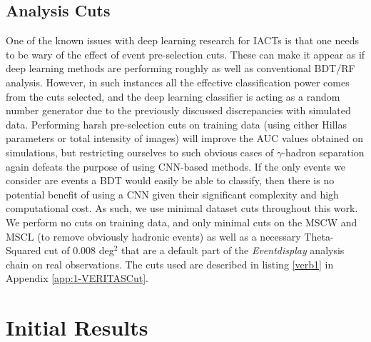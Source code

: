 \subsection{Analysis Cuts}
One of the known issues with deep learning research for IACTs is that one needs to be wary of the effect of event pre-selection cuts. These can make it appear as if deep learning methods are performing roughly as well as conventional BDT/RF analysis. However, in such instances all the effective classification power comes from the cuts selected, and the deep learning classifier is acting as a random number generator due to the previously discussed discrepancies with simulated data. Performing harsh pre-selection cuts on training data (using either Hillas parameters or total intensity of images) will improve the AUC values obtained on simulations, but restricting ourselves to such obvious cases of $\gamma$-hadron separation again defeats the purpose of using CNN-based methods. If the only events we consider are events a BDT would easily be able to classify, then there is no potential benefit of using a CNN given their significant complexity and high computational cost. As such, we use minimal dataset cuts throughout this work. We perform no cuts on training data, and only minimal cuts on the MSCW and MSCL (to remove obviously hadronic events) as well as a necessary Theta-Squared cut of 0.008 deg$^2$ that are a default part of the \textit{Eventdisplay} analysis chain on real observations. The cuts used are described in listing \ref{verb1} in Appendix \ref{app:1-VERITASCut}.

\section{Initial Results}

